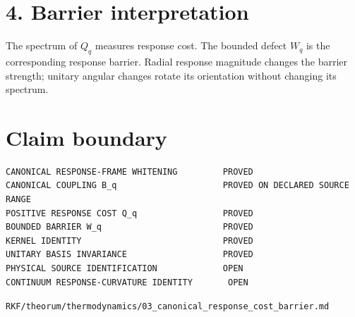 \hypertarget{barrier-interpretation}{%
\section{4. Barrier interpretation}\label{barrier-interpretation}}

The spectrum of \(Q_q\) measures response cost. The bounded defect \(W_q\) is the corresponding response barrier. Radial response magnitude changes the barrier strength; unitary angular changes rotate its orientation without changing its spectrum.

\hypertarget{claim-boundary}{%
\section{Claim boundary}\label{claim-boundary}}

\begin{verbatim}
CANONICAL RESPONSE-FRAME WHITENING         PROVED
CANONICAL COUPLING B_q                     PROVED ON DECLARED SOURCE RANGE
POSITIVE RESPONSE COST Q_q                 PROVED
BOUNDED BARRIER W_q                        PROVED
KERNEL IDENTITY                            PROVED
UNITARY BASIS INVARIANCE                   PROVED
PHYSICAL SOURCE IDENTIFICATION             OPEN
CONTINUUM RESPONSE-CURVATURE IDENTITY       OPEN
\end{verbatim}

\begin{flushright}\small\texttt{RKF/theorum/thermodynamics/03\_canonical\_response\_cost\_barrier.md}\end{flushright}
